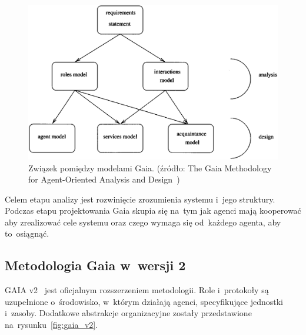 \documentclass[11pt]{report}
\begin{document}
    \begin{figure}[!ht]
        \centering
        \includegraphics[width=\linewidth]{fig/gaia models.png}
        \caption{Związek pomiędzy modelami Gaia. (źródło: The Gaia Methodology for Agent-Oriented Analysis and Design~\cite{Wooldridge2000a})}
        \label{fig:gaia}
    \end{figure}

    Celem etapu analizy jest rozwinięcie zrozumienia systemu i~jego struktury.
    Podczas etapu projektowania Gaia skupia się na~tym jak agenci mają kooperować aby zrealizować cele systemu oraz czego wymaga się od~każdego agenta, aby to~osiągnąć.

    \subsection{Metodologia Gaia w~wersji 2}
    GAIA v2~\cite{Zambonelli2003} jest oficjalnym rozszerzeniem metodologii.
    Role i~protokoły są uzupełnione o~środowisko, w~którym działają agenci, specyfikujące jednostki i~zasoby.
    Dodatkowe abstrakcje organizacyjne zostały przedstawione na~rysunku~\ref{fig:gaia_v2}.
\end{document}
